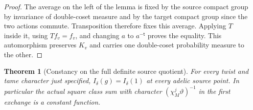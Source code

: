 \documentclass[a4paper,11pt]{article}
\newtheorem{theorem}[proposition]{Theorem}
\theoremstyle{definition}
\theoremstyle{remark}
\numberwithin{equation}{section}
\begin{document}
\begin{proof}
The average on the left of the lemma is fixed by the source
compact group by invariance of double-coset measure and by
the target compact group since the two actions commute.
Transposition therefore fixes this average. Applying \(T\)
inside it, using \(Tf_v=f_v\), and changing \(a\) to
\(a^{-\mathsf t}\) proves the equality. This automorphism
preserves \(K_v\) and carries one double-coset probability
measure to the other.
\end{proof}

\begin{theorem}[Constancy on the full definite source quotient]
\leavevmode\label{thm:globalequalrank826}
For every twist and tame character just specified,
\(I_\delta(g)=I_\delta(1)\) at every adelic source point.
In particular the actual square class sum with character
\((\chi_M^j\vartheta)^{-1}\) in the first exchange is a
constant function.
\end{theorem}
\end{document}
